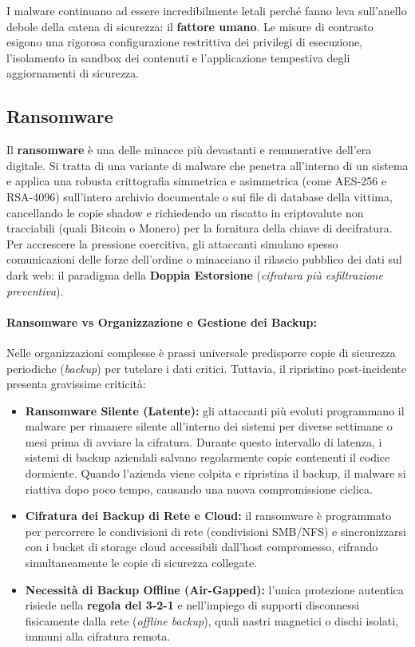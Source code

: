 \documentclass[../../main.tex]{subfiles}
\begin{document}
I malware continuano ad essere incredibilmente letali perché fanno leva sull'anello debole della catena di sicurezza: il \textbf{fattore umano}. Le misure di contrasto esigono una rigorosa configurazione restrittiva dei privilegi di esecuzione, l'isolamento in sandbox dei contenuti e l'applicazione tempestiva degli aggiornamenti di sicurezza.

\subsection{Ransomware}
\label{subsec:ransomware}

Il \textbf{ransomware} è una delle minacce più devastanti e remunerative dell'era digitale. Si tratta di una variante di malware che penetra all'interno di un sistema e applica una robusta crittografia simmetrica e asimmetrica (come AES-256 e RSA-4096) sull'intero archivio documentale o sui file di database della vittima, cancellando le copie shadow e richiedendo un riscatto in criptovalute non tracciabili (quali Bitcoin o Monero) per la fornitura della chiave di decifratura. Per accrescere la pressione coercitiva, gli attaccanti simulano spesso comunicazioni delle forze dell'ordine o minacciano il rilascio pubblico dei dati sul dark web: il paradigma della \textbf{Doppia Estorsione} (\textit{cifratura più esfiltrazione preventiva}).

\paragraph{Ransomware vs Organizzazione e Gestione dei Backup:}
Nelle organizzazioni complesse è prassi universale predisporre copie di sicurezza periodiche (\textit{backup}) per tutelare i dati critici. Tuttavia, il ripristino post-incidente presenta gravissime criticità:
\begin{itemize}
    \item \textbf{Ransomware Silente (Latente):} gli attaccanti più evoluti programmano il malware per rimanere silente all'interno dei sistemi per diverse settimane o mesi prima di avviare la cifratura. Durante questo intervallo di latenza, i sistemi di backup aziendali salvano regolarmente copie contenenti il codice dormiente. Quando l'azienda viene colpita e ripristina il backup, il malware si riattiva dopo poco tempo, causando una nuova compromissione ciclica.
    \item \textbf{Cifratura dei Backup di Rete e Cloud:} il ransomware è programmato per percorrere le condivisioni di rete (condivisioni SMB/NFS) e sincronizzarsi con i bucket di storage cloud accessibili dall'host compromesso, cifrando simultaneamente le copie di sicurezza collegate.
    \item \textbf{Necessità di Backup Offline (Air-Gapped):} l'unica protezione autentica risiede nella \textbf{regola del 3-2-1} e nell'impiego di supporti disconnessi fisicamente dalla rete (\textit{offline backup}), quali nastri magnetici o dischi isolati, immuni alla cifratura remota.
\end{itemize}
\end{document}
